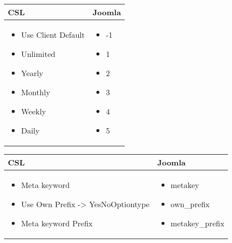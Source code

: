 \begin{minipage}{0.7\textwidth}
\begin{tabular}{|p{} | p{}|}
\hline
\textbf{CSL} & \textbf{Joomla} \\ 
\hline
\begin{itemize}
\item Use Client Default 
\item Unlimited
\item Yearly
\item Monthly
\item Weekly
\item Daily
\end{itemize}
 & 
\begin{itemize}
\item -1
\item 1
\item 2
\item 3
\item 4
\item 5
\end{itemize}
\\
\hline
\end{tabular}
\end{minipage}

\begin{minipage}{0.7\textwidth}
\begin{tabular}{|p{} | p{}|}
\hline
\textbf{CSL} & \textbf{Joomla} \\ 
\hline
\begin{itemize}
\item  Meta keyword
\item  Use Own Prefix  -> YesNoOptiontype
\item  Meta keyword Prefix
\end{itemize}
 & 
\begin{itemize}
\item  metakey
\item  own\_prefix
\item  metakey\_prefix
\end{itemize}
\\
\hline
\end{tabular}
\end{minipage}

